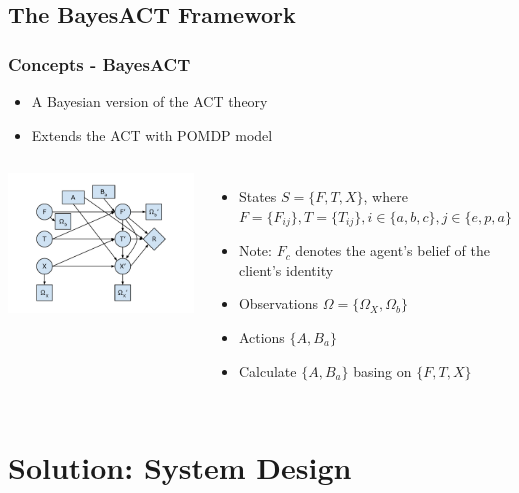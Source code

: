 \documentclass{beamer}
\begin{document}
\subsection{The BayesACT Framework}
\begin{frame}
\frametitle{Concepts - BayesACT}
\begin{itemize}
\item A Bayesian version of the ACT theory
\item Extends the ACT with POMDP model
\end{itemize}
\begin{columns}[c]
\includegraphics[trim = 20mm 10mm 20mm 10mm, clip, width=\linewidth]{fig/fig-bayesact.pdf}
\begin{itemize}
\item States $S = \{F, T, X\}$, where $F = \{F_{ij}\}, T = \{T_{ij}\}, i \in \{a, b, c\}, j \in \{e, p, a\}$
\item Note: $F_{c}$ denotes the agent's belief of the client's identity
\item Observations $\Omega = \{\Omega_{X}, \Omega_{b}\}$
\item Actions $\{A, B_{a}\}$
\item Calculate $\{A, B_{a}\}$ basing on $\{F, T, X\}$
\end{itemize}
\end{columns}
\end{frame}


\section{Solution: System Design}
\end{document}
